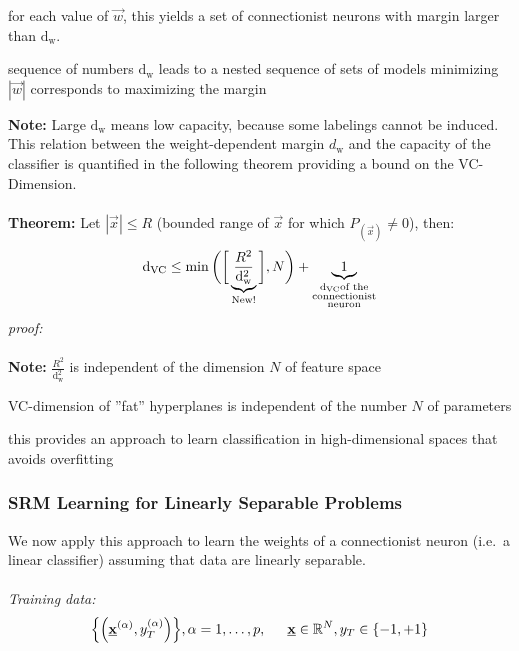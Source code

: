 \begin{itemize}
  \itl for each value of $\vec{w}$, this yields a set of connectionist
  neurons with margin larger than $\mathrm{d}_{\mathrm{w}}$.  

  \itl sequence of numbers $\mathrm{d}_{\mathrm{w}}$ leads to a nested
  sequence of sets of models
\itl minimizing $|\vec{w}|$ corresponds to maximizing the margin
\end{itemize}
\textbf{Note:} Large $\mathrm{d}_{\mathrm{w}}$ means low capacity,
because some labelings cannot be induced. This relation between the
weight-dependent margin $d_\mathrm{w}$ and the capacity of the classifier is
quantified in the following theorem providing a bound on the
VC-Dimension.
\\\\
\textbf{Theorem:} Let $|\vec{x}| \leq R$ (bounded range of $\vec{x}$
for which $P_{(\vec{x})} \neq 0$), then:
\begin{equation}
	\mathrm{d}_{\mathrm{VC}} \leq \min \bigg( \bigg[ 
		\underbrace{ \frac{R^2}{\mathrm{d}_{\mathrm{w}}^2} }_{
				\text{New!}}
		\bigg], N \bigg) + \underbrace{1}_{
				\substack{ \mathrm{d}_{\mathrm{VC}} \text{of the} \\
					\text{connectionist} \\
					\text{neuron}}}
\end{equation}
{\it proof: \textcite[ch.~8.5]{Vapnik1998}}\\\\
\textbf{Note:} $\frac{R^2}{\mathrm{d}_{\mathrm{w}}^2}$ is independent
of the dimension $N$ of feature space
\begin{itemize}
  \itl VC-dimension of ''fat'' hyperplanes is independent of the
  number $N$ of parameters 

  \itl this provides an approach to learn classification in
  high-dimensional spaces that avoids overfitting
\end{itemize}



\subsubsection{SRM Learning for Linearly Separable Problems}
We now apply this approach to learn the weights of a connectionist
neuron (i.e.\ a linear classifier) assuming that data are linearly
separable.\\\\
\emph{Training data:}
\[ \Big\{ \Big( \vec{x}^{(\alpha)}, y_T^{(\alpha)} \Big) \Big\}, \alpha = 1, 
	\ldots, p, \text{\indent} \vec{x} \in \mathbb{R}^N, y_T \in \{-1, +1\}
\]
